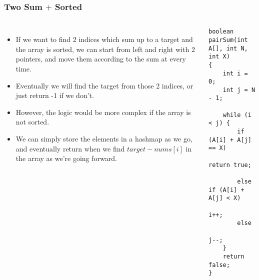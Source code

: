 \begin{frame}[fragile]
	\frametitle{Two Sum $+$ Sorted}
	
	\begin{columns}[T]
			\begin{itemize}
				\item  If we want to find 2 indices which sum up to a target and the array is sorted, we can start from left 
and right with 2 pointers, and move them according to the sum at every time. 
				\item Eventually we will find the target from those 2 indices, or just return -1 if we don’t.  
				\item However, the logic would be more complex if the array is not sorted. 
				\item We can simply store the elements 
in a hashmap as we go, and eventually return when we find $target-nums[i]$ in the array as we’re going 
forward. 
			\end{itemize}
			
		
\begin{lstlisting}
boolean pairSum(int A[], int N, int X)  
{  
    int i = 0; 
    int j = N - 1;  
   
    while (i < j) {  
        if (A[i] + A[j] == X)  
            return true;  
   
        else if (A[i] + A[j] < X)  
            i++;  
        else 
            j--;  
    }  
    return false;  
}  
\end{lstlisting}			
	\end{columns}
\end{frame}

